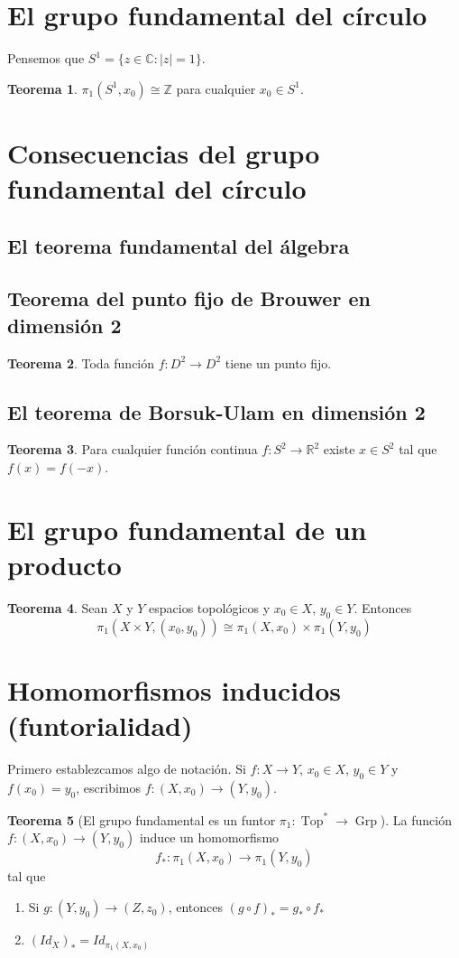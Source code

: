 \documentclass[spanish]{book}
\theoremstyle{definition}
\newtheorem*{teo}{Teorema}
\newcommand{\R}{\mathbb{R}}
\newcommand{\Z}{\mathbb{Z}}
\newcommand{\C}{\mathbb{C}}
\DeclareMathOperator{\Top}{Top}
\DeclareMathOperator{\Grp}{Grp}
\begin{document}
\section{El grupo fundamental del círculo}
	Pensemos que $S^1=\{z\in\C:|z|=1\}$.
	\begin{teo}
		$\pi_1(S^1,x_0)\cong\Z$ para cualquier $x_0\in S^1$.
	\end{teo}

\section{Consecuencias del grupo fundamental del círculo}

\subsection{El teorema fundamental del álgebra}

\subsection{Teorema del punto fijo de Brouwer en dimensión 2}
	\begin{teo}
		Toda función $f:D^2\to D^2$ tiene un punto fijo.
	\end{teo}

\subsection{El teorema de Borsuk-Ulam en dimensión 2}
	\begin{teo}
		Para cualquier función continua $f:S^2\to\R^2$ existe $x\in S^2$ tal que $f(x)=f(-x)$.
	\end{teo}
	
\section{El grupo fundamental de un producto}
	\begin{teo}
		Sean $X$ y $Y$ espacios topológicos y $x_0\in X$, $y_0\in Y$. Entonces
		\[\pi_1(X\times Y,(x_0,y_0))\cong\pi_1(X,x_0)\times\pi_1(Y,y_0)\]
	\end{teo}

\section{Homomorfismos inducidos (funtorialidad)}
	Primero establezcamos algo de notación. Si $f:X\to Y$, $x_0\in X$, $y_0\in Y$ y $f(x_0)=y_0$, escribimos $f:(X,x_0)\to(Y,y_0)$.
	\begin{teo}[El grupo fundamental es un funtor $\pi_1:\Top^*\to\Grp$]
		La función $f:(X,x_0)\to(Y,y_0)$ induce un homomorfismo \[f_*:\pi_1(X,x_0)\to\pi_1(Y,y_0)\] tal que
		\begin{enumerate}
			\item Si $g:(Y,y_0)\to(Z,z_0)$, entonces $(g\circ f)_*=g_*\circ f_*$
			\item $(Id_X)_*=Id_{\pi_1(X,x_0)}$
		\end{enumerate}
	\end{teo}
\end{document}
